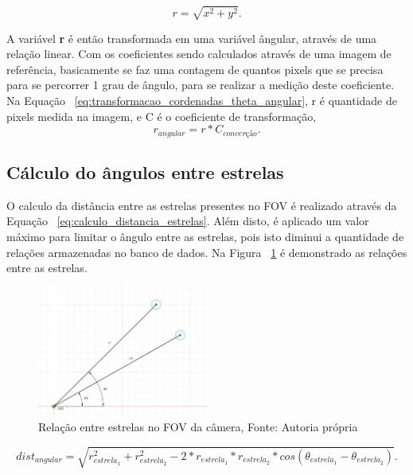 \begin{equation}
	r = \sqrt{x^2 + y^2}.
	\label{eq:transformacao_cordenadas_r}
\end{equation}

A variável \textbf{r} é então transformada em uma variável ângular, através de uma relação linear. 
Com os coeficientes sendo calculados através de uma imagem de referência, 
basicamente se faz uma contagem de quantos pixels que se precisa para se percorrer 1 grau de ângulo, para se realizar a medição deste coeficiente.
Na Equação ~\ref{eq:transformacao_cordenadas_theta_angular}, r é quantidade de pixels medida na imagem, e C é o coeficiente de transformação, 
\begin{equation}
	r_{angular} = r * C_{converção}.
	\label{eq:transformacao_cordenadas_theta_angular}
\end{equation}

\subsection{Cálculo do ângulos entre estrelas}
\label{subsec:calculo_angulos_entre_estrelas}

O calculo da distância entre as estrelas presentes no FOV é realizado através da Equação ~\ref{eq:calculo_distancia_estrelas}.
Além disto, é aplicado um valor máximo para limitar o ângulo entre as estrelas, pois isto diminui a quantidade de relações armazenadas no banco de dados.
Na Figura ~\ref{fig:angulo_entre_estrelas} é demonstrado as relações entre as estrelas.

\begin{figure}[H]
	\centering
	\includegraphics[width=0.5\textwidth]{images/relacoes_entre_estrelas.png}
	\caption{Relação entre estrelas no FOV da câmera, Fonte: Autoria própria}
	\label{fig:angulo_entre_estrelas}
\end{figure}

\begin{equation}
	dist_{angular} = \sqrt{r_{estrela_1}^2 + r_{estrela_2}^2 - 2 * r_{estrela_1} * r_{estrela_2} * cos(\theta_{estrela_1} - \theta_{estrela_2})}.
	\label{eq:calculo_distancia_estrelas}
\end{equation}

